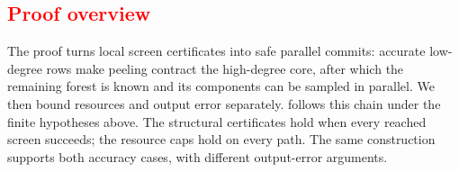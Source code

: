 \subsection{\texorpdfstring{\textcolor{red}{Proof overview}}{Proof overview}}
\label{app:upper-proof-overview}

{\color{red}
The proof turns local screen certificates into safe parallel commits:
accurate low-degree rows make peeling contract the high-degree core, after
which the remaining forest is known and its components can be sampled in
parallel.  We then bound resources and output error separately.
 follows this chain under the finite hypotheses
above.  The structural certificates hold when every reached screen succeeds;
the resource caps hold on every path.  The same construction supports both
accuracy cases, with different output-error arguments.

}
